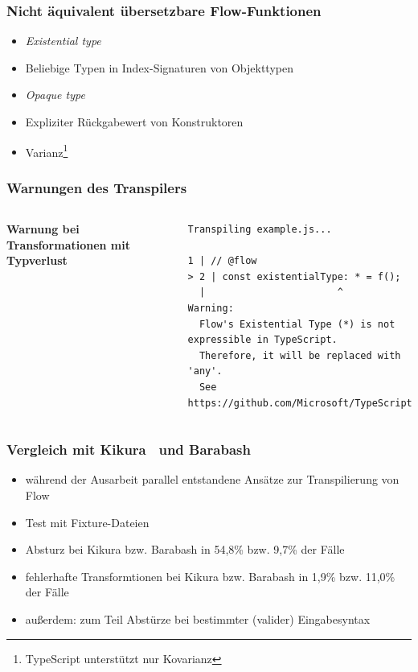    \begin{frame}[noframenumbering]
      \frametitle{Nicht äquivalent übersetzbare Flow-Funktionen}
      \begin{itemize}
        \item \textit{Existential type}
        \item Beliebige Typen in Index-Signaturen von Objekttypen
        \item \textit{Opaque type}
        \item Expliziter Rückgabewert von Konstruktoren
        \item Varianz\footnote{TypeScript unterstützt nur Kovarianz}
      \end{itemize}
    \end{frame}

    \begin{frame}
      \frametitle{Warnungen des Transpilers}
      \begin{columns}
        \column{\dimexpr\paperwidth-16mm}
        \textbf{Warnung bei Transformationen mit Typverlust}
        \vspace{1.5em}
        \begin{lstlisting}[emph={Warning},numbers=none]
Transpiling example.js...

1 | // @flow
> 2 | const existentialType: * = f();
  |                       ^
Warning:
  Flow's Existential Type (*) is not expressible in TypeScript.
  Therefore, it will be replaced with 'any'.
  See https://github.com/Microsoft/TypeScript/issues/14466.
          \end{lstlisting}
      \end{columns}
    \end{frame}

    \begin{frame}[noframenumbering]
      \frametitle{Vergleich mit Kikura~\autocite{KIKURA} und Barabash~\autocite{BARABASH}}
      \begin{itemize}
        \item während der Ausarbeit parallel entstandene Ansätze zur Transpilierung von Flow
        \item Test mit Fixture-Dateien
        \item Absturz bei Kikura bzw. Barabash in 54,8\% bzw. 9,7\% der Fälle
        \item fehlerhafte Transformtionen bei Kikura bzw. Barabash in 1,9\% bzw. 11,0\% der Fälle
        \item außerdem: zum Teil Abstürze bei bestimmter (valider) Eingabesyntax
      \end{itemize}
    \end{frame}

